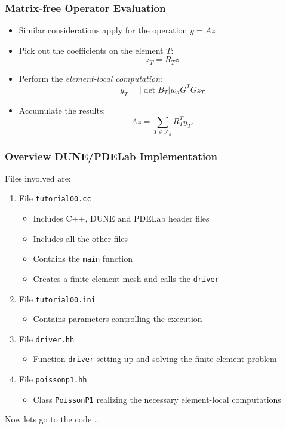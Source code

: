 \documentclass[aspectratio=169,11pt]{beamer}
\theoremstyle{definition}
\begin{document}
\begin{frame}
\frametitle{Matrix-free Operator Evaluation}
\begin{itemize}
\item Similar considerations apply for the operation $y=Az$
\item Pick out the coefficients on the element $T$:
$$z_T = R_T z$$
\item Perform the {\em element-local computation}:
\begin{equation*}
y_T = |\det B_T| w_d G^T G z_T
\end{equation*}
\item Accumulate the results:
\begin{equation*}
Az =  \sum_{T\in\mathcal{T}_h} R_T^T y_T.
\end{equation*}
\end{itemize}
\end{frame}

\begin{frame}
\frametitle{Overview DUNE/PDELab Implementation}
Files involved are:
\begin{enumerate}[1)]
\item File \lstinline{tutorial00.cc}
\begin{itemize}
\item Includes C++, DUNE and PDELab header files
\item Includes all the other files
\item Contains the \lstinline{main} function
\item Creates a finite element mesh and calls the \lstinline{driver}
\end{itemize}
\item File \lstinline{tutorial00.ini}
\begin{itemize}
\item Contains parameters controlling the execution
\end{itemize}
\item File \lstinline{driver.hh}
\begin{itemize}
\item Function \lstinline{driver} setting up and solving the finite element problem
\end{itemize}
\item File \lstinline{poissonp1.hh}
\begin{itemize}
\item Class \lstinline{PoissonP1}
realizing the necessary element-local computations
\end{itemize}
\end{enumerate}
Now lets go to the code \ldots
\end{frame}
\end{document}
